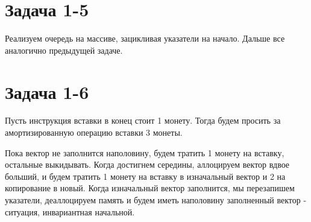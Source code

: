 \documentclass{article}
\begin{document}
\section{Задача 1-5}

Реализуем очередь на массиве, зацикливая указатели на начало. Дальше все аналогично предыдущей задаче.

\section{Задача 1-6}

Пусть инструкция вставки в конец стоит 1 монету. Тогда будем просить за амортизированную операцию вставки 3 монеты.

Пока вектор не заполнится наполовину, будем тратить 1 монету на вставку, остальные выкидывать. Когда достигнем середины, аллоцируем вектор вдвое больший, и будем тратить 1 монету на вставку в изначальный вектор и 2 на копирование в новый. Когда изначальный вектор заполнится, мы перезапишем указатели, деаллоцируем память и будем иметь наполовину заполненный вектор - ситуация, инвариантная начальной.  
\end{document}
